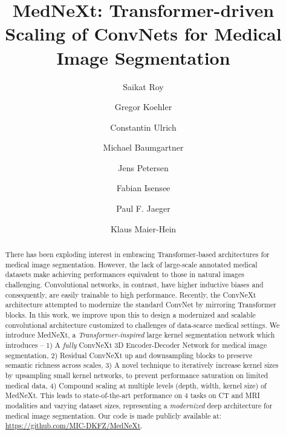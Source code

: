 \documentclass[runningheads]{llncs}
\begin{document}
\title{MedNeXt: Transformer-driven Scaling of ConvNets for Medical Image Segmentation}
\author{Saikat Roy \and Gregor Koehler  \and Constantin Ulrich  \and Michael Baumgartner  \and Jens Petersen  \and Fabian Isensee  \and Paul F. Jaeger  \and Klaus Maier-Hein }

\maketitle              \begin{abstract}
There has been exploding interest in embracing Transformer-based architectures for medical image segmentation. However, the lack of large-scale annotated medical datasets make achieving performances equivalent to those in natural images challenging. Convolutional networks, in contrast, have higher inductive biases and consequently, are easily trainable to high performance. Recently, the ConvNeXt architecture attempted to modernize the standard ConvNet by mirroring Transformer blocks. In this work, we improve upon this to design a modernized and scalable convolutional architecture customized to challenges of data-scarce medical settings. We introduce MedNeXt, a \textit{Transformer-inspired} large kernel segmentation network which introduces -- 1) A \textit{fully} ConvNeXt 3D Encoder-Decoder Network for medical image segmentation, 2) Residual ConvNeXt up and downsampling blocks to preserve semantic richness across scales, 3) A novel technique to iteratively increase kernel sizes by upsampling small kernel networks, to prevent performance saturation 
on limited medical data, 4) Compound scaling at multiple levels (depth, width, kernel size) of MedNeXt. This leads to state-of-the-art performance on 4 tasks on CT and MRI modalities and varying dataset sizes, representing a \textit{modernized} deep architecture for medical image segmentation. Our code is made publicly available at: \href{https://github.com/MIC-DKFZ/MedNeXt}{https://github.com/MIC-DKFZ/MedNeXt}.

\end{abstract}
\end{document}
